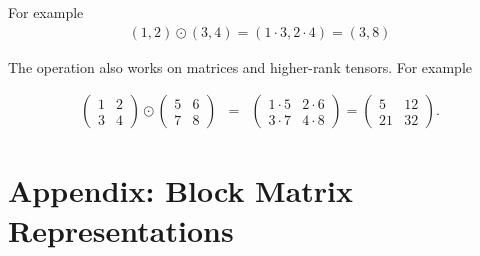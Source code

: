 For example
\begin{eqnarray}
(1,2) \odot (3,4) = (1 \cdot 3,  2 \cdot 4) =  (3,8)
\end{eqnarray}

The operation also works on matrices and higher-rank tensors. For example

\begin{eqnarray}
\begin{pmatrix} 1 & 2 \\ 3 & 4 \end{pmatrix} \odot \begin{pmatrix} 5 & 6 \\ 7 & 8 \end{pmatrix} &=& \begin{pmatrix} 1 \cdot 5 & 2 \cdot 6 \\ 3 \cdot 7 & 4 \cdot 8 \end{pmatrix} = \begin{pmatrix} 5 & 12 \\ 21 & 32 \end{pmatrix}.
\end{eqnarray}


\section{Appendix: Block Matrix Representations}

